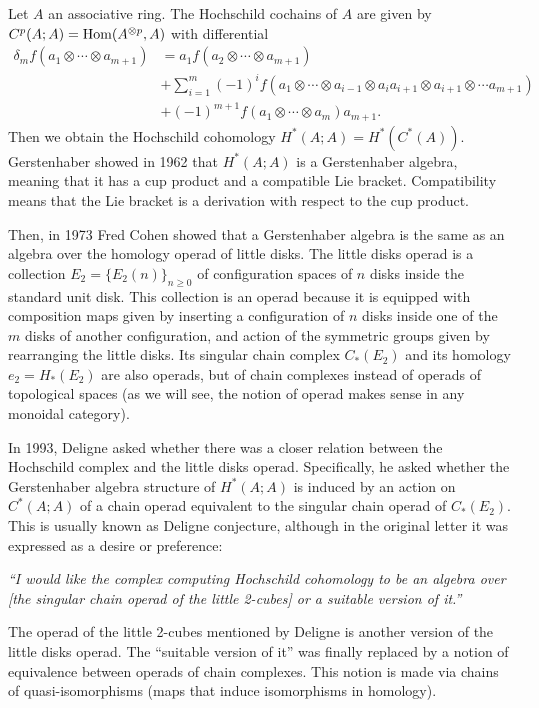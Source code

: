 \documentclass[TFM.tex]{subfiles}
\begin{document}

Let $A$ an associative ring. The Hochschild cochains of $A$ are given by $C^p(A;A)=\operatorname{Hom}(A^{\otimes p},A)$ with differential 
\begin{align*}
\delta_m f(a_1\otimes\cdots\otimes a_{m+1})&=a_1f(a_2\otimes\cdots\otimes a_{m+1})\\
& +\sum_{i=1}^m(-1)^if(a_1\otimes\cdots\otimes a_{i-1}\otimes a_ia_{i+1}\otimes a_{i+1}\otimes\cdots a_{m+1})\\
& +(-1)^{m+1}f(a_1\otimes\cdots\otimes a_m)a_{m+1}.
\end{align*}
Then we obtain the Hochschild cohomology $H^*(A;A)=H^*(C^*(A))$. Gerstenhaber showed in 1962 \cite{Gerstenhaber} that $H^*(A;A)$ is a Gerstenhaber algebra, meaning that it has a cup product and a compatible Lie bracket. Compatibility means that the Lie bracket is a derivation with respect to the cup product.

Then, in 1973 Fred Cohen \cite{cuentas} showed that a Gerstenhaber algebra is the same as an algebra over the homology operad of little disks. The little disks operad is a collection $E_2=\{E_2(n)\}_{n\geq 0}$ of configuration spaces of $n$ disks inside the standard unit disk. This collection is an operad because it is equipped with composition maps given by inserting a configuration of $n$ disks inside one of the $m$ disks of another configuration, and action of the symmetric groups given by rearranging the little disks. Its singular chain complex $C_*(E_2)$ and its homology $e_2=H_*(E_2)$ are also operads, but of chain complexes instead of operads of topological spaces (as we will see, the notion of operad makes sense in any monoidal category). 

In 1993, Deligne asked \cite{deligne} whether there was a closer relation between the Hochschild complex and the little disks operad. Specifically, he asked whether the Gerstenhaber algebra structure of $H^*(A;A)$ is induced by an action on $C^*(A;A)$ of a chain operad
equivalent to the singular chain operad of $C_*(E_2)$. This is usually known as Deligne conjecture, although in the original letter it was expressed as a desire or preference:

\emph{``I would
like the complex computing Hochschild cohomology to be an algebra over [the singular chain
operad of the little 2-cubes] or a suitable version of it.''}

The operad of the little 2-cubes mentioned by Deligne is another version of the little disks operad. The ``suitable version of it'' was finally replaced by a notion of equivalence between operads of chain complexes. This notion is made via chains of quasi-isomorphisms (maps that induce isomorphisms in homology). 
\end{document}
